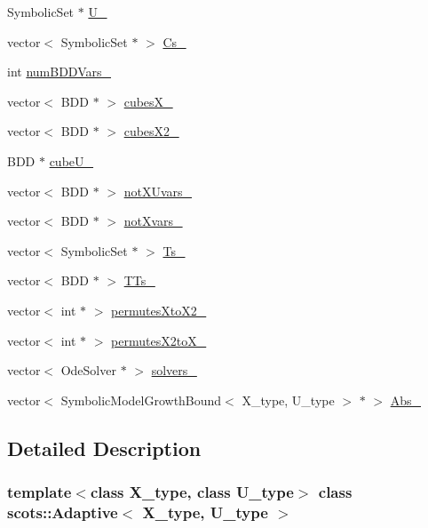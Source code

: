 \begin{DoxyCompactItemize}
\item 
Symbolic\+Set $\ast$ \hyperlink{classscots_1_1Adaptive_a89fa563cfea5b9a7bec6a705ca412a18}{U\+\_\+}
\item 
vector$<$ Symbolic\+Set $\ast$ $>$ \hyperlink{classscots_1_1Adaptive_a4937d441ac9758f33bcceeb9975fb1ce}{Cs\+\_\+}
\item 
int \hyperlink{classscots_1_1Adaptive_a753d83283386610f1a2283af5cbeba73}{num\+B\+D\+D\+Vars\+\_\+}
\item 
vector$<$ B\+DD $\ast$ $>$ \hyperlink{classscots_1_1Adaptive_ac82296bd0392bccf2a0e4af9ba70ff37}{cubes\+X\+\_\+}
\item 
vector$<$ B\+DD $\ast$ $>$ \hyperlink{classscots_1_1Adaptive_a6fa7b7542b91ec37ff2358359e425d12}{cubes\+X2\+\_\+}
\item 
B\+DD $\ast$ \hyperlink{classscots_1_1Adaptive_a0332230a9bad14d432e6651611863be9}{cube\+U\+\_\+}
\item 
vector$<$ B\+DD $\ast$ $>$ \hyperlink{classscots_1_1Adaptive_ac3f203003011bcea5176ef294ab7a8a0}{not\+X\+Uvars\+\_\+}
\item 
vector$<$ B\+DD $\ast$ $>$ \hyperlink{classscots_1_1Adaptive_a8fbbf6976e589506c9e4c38045196c07}{not\+Xvars\+\_\+}
\item 
vector$<$ Symbolic\+Set $\ast$ $>$ \hyperlink{classscots_1_1Adaptive_ab9f37fda9e698b797079d28b243f3a5b}{Ts\+\_\+}
\item 
vector$<$ B\+DD $\ast$ $>$ \hyperlink{classscots_1_1Adaptive_a1f4c02094ecd380887640c83fc1d0310}{T\+Ts\+\_\+}
\item 
vector$<$ int $\ast$ $>$ \hyperlink{classscots_1_1Adaptive_ae954d4d3177bdc4093530e254ace2b34}{permutes\+Xto\+X2\+\_\+}
\item 
vector$<$ int $\ast$ $>$ \hyperlink{classscots_1_1Adaptive_a88edb6662310c07120d07c9dff968ddc}{permutes\+X2to\+X\+\_\+}
\item 
vector$<$ Ode\+Solver $\ast$ $>$ \hyperlink{classscots_1_1Adaptive_a0b300511b5f746c7b24ead30dc0ca9ac}{solvers\+\_\+}
\item 
vector$<$ Symbolic\+Model\+Growth\+Bound$<$ X\+\_\+type, U\+\_\+type $>$ $\ast$ $>$ \hyperlink{classscots_1_1Adaptive_ab51fe5639ecc8fd046c1d2d56fb25890}{Abs\+\_\+}
\end{DoxyCompactItemize}


\subsection{Detailed Description}
\subsubsection*{template$<$class X\+\_\+type, class U\+\_\+type$>$\newline
class scots\+::\+Adaptive$<$ X\+\_\+type, U\+\_\+type $>$}

